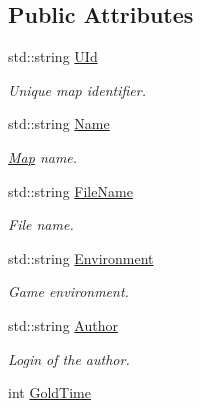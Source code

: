 \subsection*{Public Attributes}
\begin{DoxyCompactItemize}
\item 
\hypertarget{structMap_aeeaed7abcf77e119d5f59c0918183834}{std\-::string \hyperlink{structMap_aeeaed7abcf77e119d5f59c0918183834}{U\-Id}}\label{structMap_aeeaed7abcf77e119d5f59c0918183834}

\begin{DoxyCompactList}\small\item\em Unique map identifier. \end{DoxyCompactList}\item 
\hypertarget{structMap_ab1a5bf049a4b74e704128d31e9b53b8c}{std\-::string \hyperlink{structMap_ab1a5bf049a4b74e704128d31e9b53b8c}{Name}}\label{structMap_ab1a5bf049a4b74e704128d31e9b53b8c}

\begin{DoxyCompactList}\small\item\em \hyperlink{structMap}{Map} name. \end{DoxyCompactList}\item 
\hypertarget{structMap_a0ec301bf4f1d129cd9bc50999581eec9}{std\-::string \hyperlink{structMap_a0ec301bf4f1d129cd9bc50999581eec9}{File\-Name}}\label{structMap_a0ec301bf4f1d129cd9bc50999581eec9}

\begin{DoxyCompactList}\small\item\em File name. \end{DoxyCompactList}\item 
\hypertarget{structMap_acbaadf8f635b04a1229fa01f6ec4c4dc}{std\-::string \hyperlink{structMap_acbaadf8f635b04a1229fa01f6ec4c4dc}{Environment}}\label{structMap_acbaadf8f635b04a1229fa01f6ec4c4dc}

\begin{DoxyCompactList}\small\item\em Game environment. \end{DoxyCompactList}\item 
\hypertarget{structMap_a1eb246326a4ec70df2dc71887efca5c9}{std\-::string \hyperlink{structMap_a1eb246326a4ec70df2dc71887efca5c9}{Author}}\label{structMap_a1eb246326a4ec70df2dc71887efca5c9}

\begin{DoxyCompactList}\small\item\em Login of the author. \end{DoxyCompactList}\item 
\hypertarget{structMap_a769a574be92aa024f7804627c167ceff}{int \hyperlink{structMap_a769a574be92aa024f7804627c167ceff}{Gold\-Time}}\label{structMap_a769a574be92aa024f7804627c167ceff}


\end{DoxyCompactItemize}
